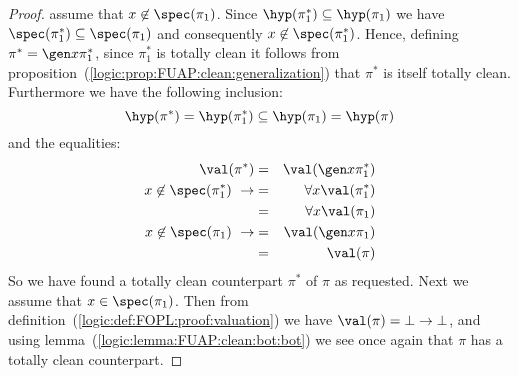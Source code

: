 \begin{proof}
assume that $x\not\in\spec(\pi_{1})$. Since
$\hyp(\pi_{1}^{*})\subseteq\hyp(\pi_{1})$ we have
$\spec(\pi_{1}^{*})\subseteq\spec(\pi_{1})$ and consequently
$x\not\in\spec(\pi_{1}^{*})$. Hence, defining $\pi^{*}=\gen
x\pi_{1}^{*}$, since $\pi_{1}^{*}$ is totally clean it follows from
proposition~(\ref{logic:prop:FUAP:clean:generalization}) that
$\pi^{*}$ is itself totally clean. Furthermore we have the following
inclusion:
    \[
    \hyp(\pi^{*})=\hyp(\pi_{1}^{*})\subseteq\hyp(\pi_{1})=\hyp(\pi)
    \]
and the equalities:
    \begin{eqnarray*}
    \val(\pi^{*})&=&\val(\gen x\pi_{1}^{*})\\
    x\not\in\spec(\pi_{1}^{*})\ \rightarrow
    &=&\forall x\val(\pi_{1}^{*})\\
    &=&\forall x\val(\pi_{1})\\
    x\not\in\spec(\pi_{1})\ \rightarrow
    &=&\val(\gen x\pi_{1})\\
    &=&\val(\pi)
    \end{eqnarray*}
So we have found a totally clean counterpart $\pi^{*}$ of $\pi$ as
requested. Next we assume that $x\in\spec(\pi_{1})$. Then from
definition~(\ref{logic:def:FOPL:proof:valuation}) we have
$\val(\pi)=\bot\to\bot$, and using
lemma~(\ref{logic:lemma:FUAP:clean:bot:bot}) we see once again that
$\pi$ has a totally clean counterpart.
\end{proof}
